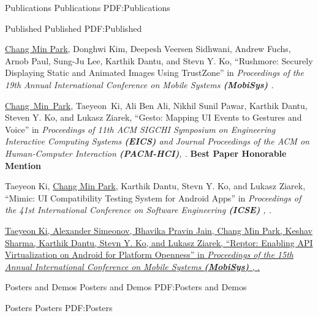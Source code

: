 \documentclass[letterpaper,MMMyyyy,nonstopmode]{simpleresumecv}
\begin{document}
\begin{Body}
\vspace{-0.5ex}
\Section
{Publications}
{Publications}
{PDF:Publications}


\SubSection
{Published}
{Published}
{PDF:Published}

\begingroup
\renewcommand{\MaxNumberedItem}{[88]}

\Gap
\NumberedItem{[1]}
\underline{Chang Min Park}, Donghwi Kim, Deepesh Veersen Sidhwani, Andrew Fuchs, Arnob Paul,
Sung-Ju Lee, Karthik Dantu, and Stevn Y. Ko,
``Rushmore: Securely Displaying Static and Animated Images Using TrustZone'' in
\textit{Proceedings of the 19th Annual International Conference on Mobile Systems \textbf{(MobiSys)}
.}


\Gap
\NumberedItem{[2]} 
\underline{Chang~Min~Park}, Taeyeon~Ki, Ali Ben Ali, 
Nikhil Sunil Pawar, Karthik Dantu, Steven Y. Ko, and Lukasz Ziarek, 
``Gesto: Mapping UI Events to Gestures and Voice'' in
\textit{Proceedings of 11th ACM SIGCHI Symposium on Engineering Interactive Computing Systems \textbf{(EICS)}
and \textit{Journal Proceedings of the ACM on Human-Computer Interaction \textbf{(PACM-HCI)}}, .}
\linebreak\textbf{Best Paper Honorable Mention}

\Gap
\NumberedItem{[3]}
Taeyeon Ki, \underline{Chang Min Park}, Karthik Dantu, Stevn Y. Ko, and Lukasz Ziarek, 
``Mimic: UI Compatibility Testing System for Android Apps'' in
\textit{Proceedings of the 41st International Conference on Software Engineering \textbf{(ICSE)}
, .}

\Gap
\NumberedItem{[4]}
\href{https://dl.acm.org/citation.cfm?id=3081341}
{Taeyeon Ki, Alexander Simeonov, Bhavika Pravin Jain, \underline{Chang Min Park},
Keshav Sharma, Karthik Dantu, Stevn Y. Ko, and Lukasz Ziarek, 
``Reptor: Enabling API Virtualization on Android for Platform Openness'' in 
\textit{Proceedings of the 15th Annual International Conference on Mobile Systems \textbf{(MobiSys)}
, }.}




\vspace{0ex}
\Section
{Posters and Demos}
{Posters and Demos}
{PDF:Posters and Demos}

\SubSection
{Posters}
{Posters}
{PDF:Posters}


\end{Body}
\end{document}
